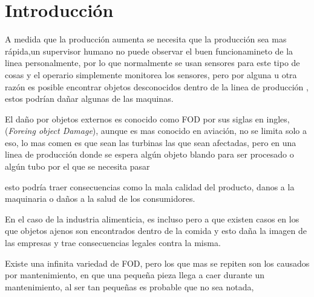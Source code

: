 \chapter{Introducción}\label{intro}



A medida que la producción aumenta se necesita que la producción sea mas rápida,un supervisor humano no puede observar el buen funcionamineto de la linea personalmente, por lo que normalmente se usan sensores para este tipo de cosas y el operario simplemente monitorea los sensores, pero por alguna u otra razón es posible encontrar objetos desconocidos dentro de la linea de producción , estos podrían dañar algunas de las maquinas.

El daño por objetos externos es conocido como FOD  por sus siglas en ingles, (\textit{Foreing object Damage}), aunque es mas conocido en aviación, no se limita solo a eso, lo mas comen es que sean las turbinas las que sean afectadas, pero en una linea de producción donde se espera algún objeto blando para ser procesado o algún tubo por el que se necesita pasar 

esto podría traer consecuencias como la mala calidad del producto, danos a la maquinaria o daños a la salud de los consumidores.

En el caso de la industria alimenticia, es incluso pero a que existen casos en los que objetos ajenos son encontrados dentro de la comida y esto daña la imagen de las empresas y trae consecuencias legales contra la misma.

Existe una infinita variedad de FOD, pero los que mas se repiten son los causados por mantenimiento, en que una pequeña pieza llega a caer durante un mantenimiento, al ser tan pequeñas es probable que no sea notada,


